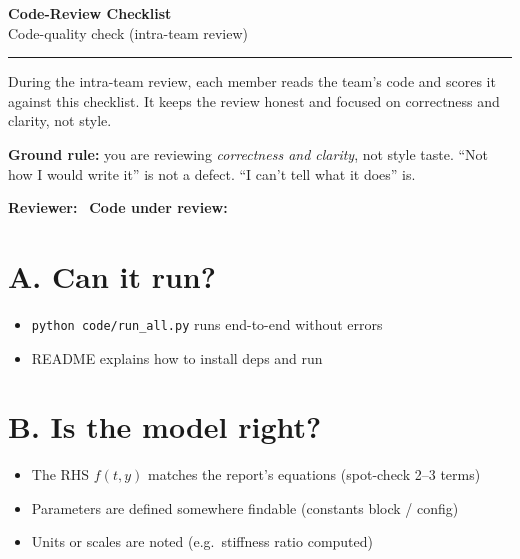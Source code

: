 \documentclass[11pt]{article}
\newcommand{\fillbox}[1][3cm]{\framebox[#1]{\rule{0pt}{2.4ex}\rule{#1}{0pt}}}
\begin{document}
\begin{center}
  {\LARGE\bfseries Code-Review Checklist}\\[0.4em]
  {\large Code-quality check (intra-team review)}
\end{center}
\vspace{0.2em}
\hrule
\vspace{0.6em}

During the intra-team review, each member reads the team's code and scores
it against this checklist. It keeps the review honest and focused on
correctness and clarity, not style.

\textbf{Ground rule:} you are reviewing \emph{correctness and clarity}, not
style taste. ``Not how I would write it'' is not a defect. ``I can't tell what
it does'' is.

\noindent
\textbf{Reviewer:}~\fillbox[4cm] \quad
\textbf{Code under review:}~\fillbox[4cm]

\section*{A. Can it run?}
\begin{itemize}[leftmargin=2.4em, itemsep=1pt]
  \item[$\square$] \texttt{python code/run\_all.py} runs end-to-end without errors
  \item[$\square$] README explains how to install deps and run
\end{itemize}

\section*{B. Is the model right?}
\begin{itemize}[leftmargin=2.4em, itemsep=1pt]
  \item[$\square$] The RHS $f(t, y)$ matches the report's equations (spot-check 2--3 terms)
  \item[$\square$] Parameters are defined somewhere findable (constants block / config)
  \item[$\square$] Units or scales are noted (e.g.\ stiffness ratio computed)
\end{itemize}

\end{document}
